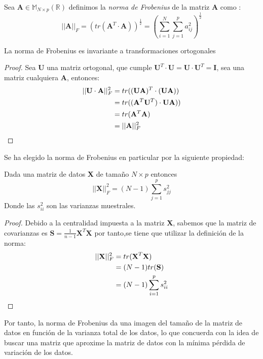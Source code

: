 \begin{defi}
Sea $\textbf{A}\in \mathbb{M}_{N\times p}(\mathbb{R})$ definimos la \textit{norma de Frobenius} de la matriz \textbf{A} como :
\begin{equation}
||\textbf{A}||_F=(tr(\textbf{A}^T\cdot \textbf{A}))^{\frac{1}{2}}=\left(\sum_{i=1}^{N}\sum _{j=1}^{p}a_{ij}^2\right)^{\frac{1}{2}}
\end{equation}
\end{defi}

\begin{propo}
La norma de Frobenius es invariante a transformaciones ortogonales
\begin{proof}
Sea $\mathbf{U}$ una matriz ortogonal, que cumple $\mathbf{U}^T\cdot \mathbf{U}=\mathbf{U}\cdot \mathbf{U}^T=\textbf{I}$, sea una matriz cualquiera $\mathbf{A}$, entonces:
\begin{align*}
||\mathbf{U} \cdot \mathbf{A}||_F^2&=tr((\mathbf{U} \mathbf{A})^T\cdot(\mathbf{U} \mathbf{A}))\\
&=tr((\mathbf{A}^T \mathbf{U}^T)\cdot \mathbf{U} \mathbf{A}))\\
&=tr(\mathbf{A}^T \mathbf{A})\\
&=||\mathbf{A}||_F^2\qedhere
\end{align*}
\end{proof}
\end{propo}

\noindent Se ha elegido la norma de Frobenius en particular por la siguiente propiedad:

\begin{propo}
Dada una matriz de datos \textbf{X} de tamaño $N\times p$ entonces
\begin{equation}
||\textbf{X}||_F^2=(N-1)\sum_{j=1}^p s_{jj}^2
\end{equation}
Donde las $s_{ii}^2$ son las varianzas muestrales.
\begin{proof}
Debido a la centralidad impuesta a la matriz \textbf{X}, sabemos que la matriz de covarianzas es $\textbf{S}=\frac{1}{n-1}\textbf{X}^T \textbf{X}$ por tanto,se tiene que utilizar la definición de la norma:
\begin{align*}
||\textbf{X}||_F^2 &= tr(\textbf{X}^T\textbf{X})\\
&= (N-1) tr(\textbf{S})\\
&= (N-1) \sum_{i=1}^p s_{ii}^2 \qedhere
\end{align*}
\end{proof}
\end{propo}
\noindent Por tanto, la norma de Frobenius da una imagen del tamaño de la matriz de datos en función de la varianza total de los datos, lo que concuerda con la idea de buscar una matriz que aproxime la matriz de datos con la mínima pérdida de variación de los datos.  

